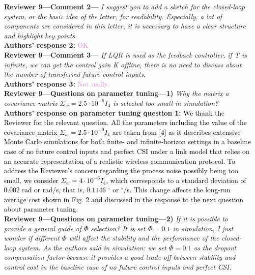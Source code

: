 \textbf{Reviewer 9—Comment 2—}\textit{%
I suggest you to add a sketch for the closed-loop system, or the basic idea of the letter, for readability. Especially, a lot of components are considered in this letter, it is necessary to have a clear structure and highlight key points.}\\[2mm]
\textbf{Authors' response 2:} \textcolor{violet}{OK}\\[4mm]
\textbf{Reviewer 9—Comment 3—}\textit{%
If LQR is used as the feedback controller, if T is infinite, we can get the control gain K offline, there is no need to discuss about the number of transferred future control inputs.}\\[2mm]
\textbf{Authors' response 3:} \textcolor{violet}{Not really.}\\[4mm]
\textbf{Reviewer 9—Questions on parameter tuning—1)}\textit{ %
Why the matrix a covariance matrix $\Sigma_{w}=2.5\cdot 10^{-9} I_4$ is selected too small in simulation?}\\[2mm]
\textbf{Authors' response on parameter tuning question 1:} \textcolor{black}{We thank the Reviewer for the relevant question. All the parameters including the value of the covariance matrix $\Sigma_{w}=2.5\cdot 10^{-9} I_4$ are taken from [4] as it describes extensive Monte Carlo simulations for both finite- and infinite-horizon settings in a baseline case of no future control inputs and perfect CSI under a
link model that relies on an accurate representation of a realistic wireless communication protocol. To address the Reviewer's concern regarding the process noise possibly being too small, we consider $\Sigma_{w}=4\cdot 10^{-6} I_4$, which corresponds to a standard deviation of $0.002$ rad or rad/s, that is, $0.1146$ $^{\circ}$ or $^{\circ}\!$/s. This change affects the long-run average cost shown in Fig. 2 and discussed in the response to the next question about parameter tuning.}\\[4mm]
\textbf{Reviewer 9—Questions on parameter tuning—2)}\textit{ %
If it is possible to provide a general guide of $\mathit{\Phi}$ selection? It is set $\mathit{\Phi}=0.1$ in simulation, I just wonder if different $\mathit{\Phi}$ will affect the stability and the performance of the closed-loop system. 
As the authors said in simulation: we set $\mathit{\Phi}=0.1$ as the dropout compensation factor because it provides a good trade-off between stability and control cost in the baseline case of no future control inputs and perfect CSI.} \\[2mm]
